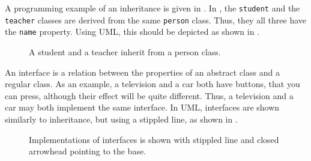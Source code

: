 \documentclass[fsharpNotes.tex]{subfiles}
\begin{document}
A programming example of an inheritance is given in .
% 
% 
In , the \lstinline{student} and the \lstinline{teacher} classes are derived from the same \lstinline{person} class. Thus, they all three have the \lstinline{name} property. Using UML, this should be depicted as shown in .
\begin{figure}
  \centering
  \caption{A student and a teacher inherit from a person class.}
  \label{fig:umlInheritanceUML}
\end{figure}

An interface is a relation between the properties of an abstract class and a regular class. As an example, a television and a car both have buttons, that you can press, although their effect will be quite different. Thus, a television and a car may both implement the same interface. In UML, interfaces are shown similarly to inheritance, but using a stippled line, as shown in .
\begin{figure}
  \centering
  \caption{Implementations of interfaces is shown with stippled line and closed arrowhead pointing to the base.}
  \label{fig:implement}
\end{figure}
\end{document}
